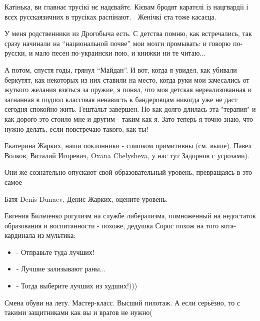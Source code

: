 \begin{itemize}

Катінька, ви главнає трусікі нє надєвайтє. Кієвам бродят каратєлі із нацгвардіі
і всєх русскаязичних в трусіках распінают. 🤣 Женічкі єта тоже касаєца.


У меня родственники из Дрогобыча есть. С детства помню, как встречались, так
сразу начинали на \enquote{национальной почве} мои мозги промывать: и говорю по-русски,
и мало песен по-украински пою, и книжки ни те читаю...

А потом, спустя годы, грянул \enquote{Майдан}. И вот, когда я увидел, как убивали
беркутят, как некоторых из них ставили на место, когда руки мои зачесались от
жуткого желания взяться за оружие, я понял, что моя детская нереализованная и
загнанная в подпол классовая ненависть к бандеровцам никогда уже не даст
сегодня спокойно жить. Гештальт завершен. Но как долго длилась эта "терапия" и
как дорого это стоило мне и другим - таким как я.  Зато теперь я точно знаю,
что нужно делать, если повстречаю такого, как ты!


Екатерина Жарких, наши поклонники - слишком примитивны (см. выше). Павел
Волков, Виталий Игоревич, Oxana Chelysheva, у нас тут Задорнов с угрозами).


Они же сознательно опускают свой образовательный уровень, превращаясь в это самое

Батя Denis Dunaev, Денис Жарких, оцените уровень.


Евгения Бильченко рогулизм на службе либерализма, помноженный на недостаток
образования и воспитанности - похоже, дедушка Сорос похож на того
кота-кардинала из мультика:
\begin{itemize}
  \item - Отправьте туда лучших!
  \item - Лучшие зализывают раны...
  \item - Тогда выберите лучших из худших!)))
\end{itemize}

Смена обуви на лету. Мастер-класс. Высший пилотаж. А если серьёзно, то с такими защитниками как вы и врагов не нужно(

\begin{itemize}


\end{itemize}
\end{itemize}
